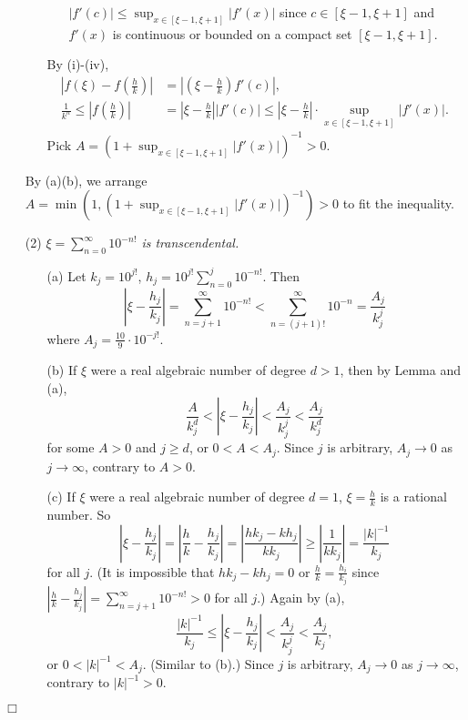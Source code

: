 \documentclass{article}
\begin{document}
\begin{enumerate}
\begin{enumerate}
\begin{enumerate}
$|f'(c)| \leq \sup_{x \in [\xi - 1, \xi + 1]}|f'(x)|$ since
$c \in [\xi - 1, \xi + 1]$
and $f'(x)$ is continuous or bounded on a compact set $[\xi - 1, \xi + 1]$.
\end{enumerate}
By (i)-(iv),
\begin{align*}
  \left| f(\xi) - f\left( \frac{h}{k} \right) \right|
  &= \left| \left( \xi - \frac{h}{k} \right) f'(c) \right|, \\
  \frac{1}{k^n} \leq \left| f\left( \frac{h}{k} \right) \right|
  &= \left| \xi - \frac{h}{k} \right| |f'(c)|
  \leq \left| \xi - \frac{h}{k} \right| \cdot \sup_{x \in [\xi - 1, \xi + 1]}|f'(x)|.
\end{align*}
Pick $A = (1 + \sup_{x \in [\xi - 1, \xi + 1]}|f'(x)|)^{-1} > 0$.
\end{enumerate}
By (a)(b), we arrange
$A = \min(1, (1 + \sup_{x \in [\xi - 1, \xi + 1]}|f'(x)|)^{-1}) > 0$
to fit the inequality.
\item[(2)]
\emph{$\xi = \sum_{n=0}^{\infty} 10^{-n!}$ is transcendental.}
\begin{enumerate}
\item[(a)]
Let $k_j = 10^{j!}$, $h_j = 10^{j!} \sum_{n=0}^{j} 10^{-n!}$.
Then
$$\left| \xi - \frac{h_j}{k_j} \right|
= \sum_{n=j+1}^{\infty} 10^{-n!}
< \sum_{n=(j+1)!}^{\infty} 10^{-n}
= \frac{A_j}{k_j^{j}}
$$
where $A_j = \frac{10}{9} \cdot 10^{-j!}$.
\item[(b)]
If $\xi$ were a real algebraic number of degree $d > 1$,
then by Lemma and (a),
$$\frac{A}{k_j^{d}}
< \left| \xi - \frac{h_j}{k_j} \right|
< \frac{A_j}{k_j^{j}}
< \frac{A_j}{k_j^{d}}$$
for some $A > 0$ and $j \geq d$,
or $0 < A < A_j$.
Since $j$ is arbitrary,
$A_j \rightarrow 0$ as $j \rightarrow \infty$,
contrary to $A > 0$.
\item[(c)]
If $\xi$ were a real algebraic number of degree $d = 1$,
$\xi = \frac{h}{k}$ is a rational number.
So
$$\left| \xi - \frac{h_j}{k_j} \right|
= \left| \frac{h}{k} - \frac{h_j}{k_j} \right|
= \left| \frac{h k_j - k h_j}{k k_j} \right|
\geq \left| \frac{1}{k k_j} \right|
= \frac{|k|^{-1}}{k_j}$$
for all $j$.
(It is impossible that $h k_j - k h_j = 0$ or $\frac{h}{k} = \frac{h_i}{k_j}$
since $| \frac{h}{k} - \frac{h_j}{k_j} | = \sum_{n=j+1}^{\infty} 10^{-n!} > 0$ for all $j$.)
Again by (a),
$$\frac{|k|^{-1}}{k_j}
\leq \left| \xi - \frac{h_j}{k_j} \right|
< \frac{A_j}{k_j^{j}}
< \frac{A_j}{k_j},$$
or $0 < |k|^{-1} < A_j$.
(Similar to (b).)
Since $j$ is arbitrary,
$A_j \rightarrow 0$ as $j \rightarrow \infty$,
contrary to $|k|^{-1} > 0$.
\end{enumerate}
\end{enumerate}
$\Box$ \\\\
\end{document}
